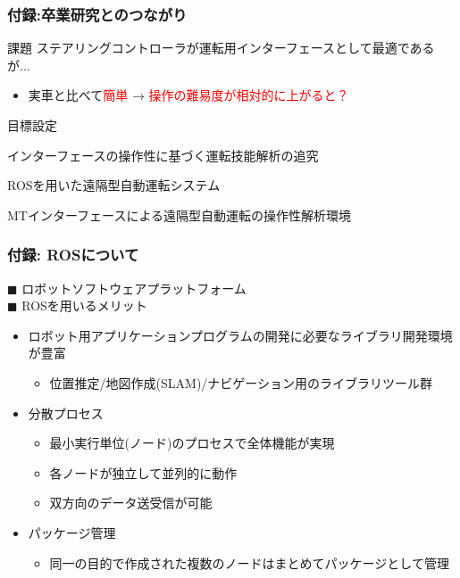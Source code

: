 \documentclass[unicode, 9pt, aspectratio=169]{beamer}
\begin{document}
\begin{frame}
  \frametitle{付録:卒業研究とのつながり}
  \centering
  \begin{minipage}{.8\linewidth}
    \begin{block}{課題}
      ステアリングコントローラが運転用インターフェースとして最適であるが...
      \begin{itemize}
        \item 実車と比べて\textcolor{red}{簡単} → \textcolor{red}{操作の難易度が相対的に上がると？}
      \end{itemize}
    \end{block}

    \begin{alertblock}{目標設定}
      \begin{description}[目的]
        \item[目的] インターフェースの操作性に基づく運転技能解析の追究
        \item[提案] ROSを用いた遠隔型自動運転システム
        \item[方法] MTインターフェースによる遠隔型自動運転の操作性解析環境
      \end{description}
    \end{alertblock}
  \end{minipage}
\end{frame}

\begin{frame}
  \frametitle{付録: ROSについて}
  $\blacksquare$ ロボットソフトウェアプラットフォーム\\
  $\blacksquare$ ROSを用いるメリット
  \begin{itemize}
    \item ロボット用アプリケーションプログラムの開発に必要なライブラリ開発環境が豊富
    \begin{itemize}
      \item 位置推定/地図作成(SLAM)/ナビゲーション用のライブラリツール群
    \end{itemize}
    \item 分散プロセス
    \begin{itemize}
      \item 最小実行単位(ノード)のプロセスで全体機能が実現
      \item 各ノードが独立して並列的に動作
      \item 双方向のデータ送受信が可能
    \end{itemize}
    \item パッケージ管理
    \begin{itemize}
      \item 同一の目的で作成された複数のノードはまとめてパッケージとして管理
    \end{itemize}
  \end{itemize}
\end{frame}
\end{document}
